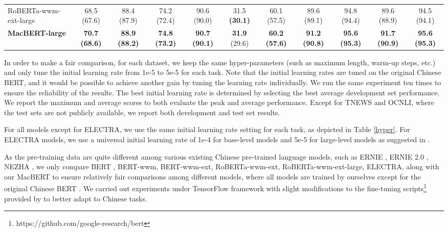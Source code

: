 \documentclass[journal]{IEEEtran}
\begin{document}
\begin{CJK*}{UTF8}{gbsn}
\begin{table*}[htbp]
\begin{center}
\begin{tabular}{l c c c c c c | c c c c}
RoBERTa-wwm-ext-large & 68.5 \tiny(67.6) & 88.4 \tiny(87.9) & 74.2 \tiny(72.4) & 90.6 \tiny(90.0) & 31.5 \bf \tiny(30.1) & 60.1 \tiny(57.5)  & 89.6 \tiny(89.1) & 94.8 \tiny(94.4) & 89.6 \tiny(88.9) & 94.5 \tiny(94.1) \\
\bf MacBERT-large 		& \bf 70.7 \tiny(68.6) & \bf 88.9 \tiny(88.2) & \bf 74.8 \tiny(73.2) & \bf 90.7 \tiny(90.1) & {\bf 31.9} \tiny(29.6) & \bf 60.2 \tiny(57.6) & \bf 91.2 \tiny(90.8) & \bf 95.6 \tiny(95.3) & \bf 91.7 \tiny(90.9) & \bf 95.6 \tiny(95.3) \\
\bottomrule
\end{tabular}
\end{center}
\end{table*}


In order to make a fair comparison, for each dataset, we keep the same hyper-parameters (such as maximum length, warm-up steps, etc.) and only tune the initial learning rate from 1e-5 to 5e-5 for each task.
Note that the initial learning rates are tuned on the original Chinese BERT, and it would be possible to achieve another gain by tuning the learning rate individually. 
We run the same experiment ten times to ensure the reliability of the results.
The best initial learning rate is determined by selecting the best average development set performance.
We report the maximum and average scores to both evaluate the peak and average performance.
Except for TNEWS and OCNLI, where the test sets are not publicly available, we report both development and test set results.

For all models except for ELECTRA, we use the same initial learning rate setting for each task, as depicted in Table \ref{hyper}.
For ELECTRA models, we use a universal initial learning rate of 1e-4 for base-level models and 5e-5 for large-level models as suggested in \cite{clark2020electra}.

As the pre-training data are quite different among various existing Chinese pre-trained language models, such as ERNIE \cite{sun2019ernie}, ERNIE 2.0 \cite{sun2019ernie2}, NEZHA \cite{wei2019nezha}, we only compare BERT \cite{devlin-etal-2019-bert}, BERT-wwm, BERT-wwm-ext, RoBERTa-wwm-ext, RoBERTa-wwm-ext-large, ELECTRA, along with our MacBERT to ensure relatively fair comparisons among different models, where all models are trained by ourselves except for the original Chinese BERT \cite{devlin-etal-2019-bert}.
We carried out experiments under TensorFlow framework \cite{abadi2016tensorflow} with slight modifications to the fine-tuning scripts\footnote{https://github.com/google-research/bert} provided by \cite{devlin-etal-2019-bert} to better adapt to Chinese tasks.




\end{CJK*}
\end{document}
